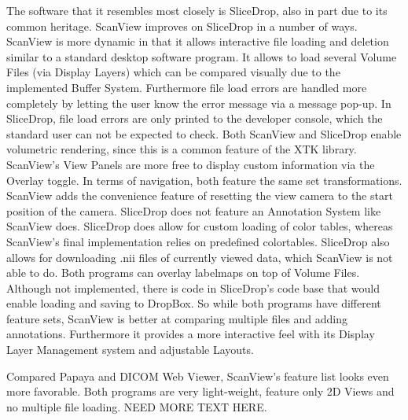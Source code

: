 \documentclass[a4paper,11pt,titlepage]{article}
\begin{document}
The software that it resembles most closely is SliceDrop, also in part due to its common heritage. ScanView improves on SliceDrop in a number of ways. ScanView is more dynamic in that it allows interactive file loading and deletion similar to a standard desktop software program. It allows to load several Volume Files (via Display Layers) which can be compared visually due to the implemented Buffer System. Furthermore file load errors are handled more completely by letting the user know the error message via a message pop-up. In SliceDrop, file load errors are only printed to the developer console, which the standard user can not be expected to check. Both ScanView and SliceDrop enable volumetric rendering, since this is a common feature of the XTK library. ScanView's View Panels are more free to display custom information via the Overlay toggle. In terms of navigation, both feature the same set transformations. ScanView adds the convenience feature of resetting the view camera to the start position of the camera. SliceDrop does not feature an Annotation System like ScanView does. SliceDrop does allow for custom loading of color tables, whereas ScanView's final implementation relies on predefined colortables. SliceDrop also allows for downloading .nii files of currently viewed data, which ScanView is not able to do. Both programs can overlay labelmaps on top of Volume Files. Although not implemented, there is code in SliceDrop's code base that would enable loading and saving to DropBox. So while both programs have different feature sets, ScanView is better at comparing multiple files and adding annotations. Furthermore it provides a more interactive feel with its Display Layer Management system and adjustable Layouts.

Compared Papaya and DICOM Web Viewer, ScanView's feature list looks even more favorable. Both programs are very light-weight, feature only 2D Views and no multiple file loading. NEED MORE TEXT HERE.
\end{document}
